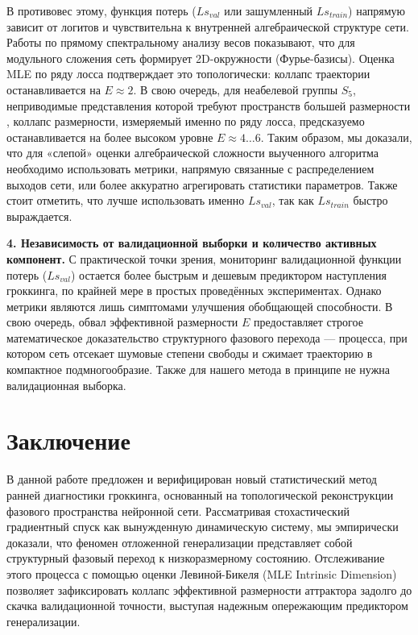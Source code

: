 \documentclass{article}
\begin{document}
В противовес этому, функция потерь ($Ls_{val}$ или зашумленный $Ls_{train}$) напрямую зависит от логитов и чувствительна к внутренней алгебраической структуре сети. Работы по прямому спектральному анализу весов \cite{nanda2023progress} показывают, что для модульного сложения сеть формирует 2D-окружности (Фурье-базисы). Оценка MLE по ряду лосса подтверждает это топологически: коллапс траектории останавливается на $E \approx 2$. В свою очередь, для неабелевой группы $S_5$, неприводимые представления которой требуют пространств большей размерности \cite{chughtai2023toy}, коллапс размерности, измеряемый именно по ряду лосса, предсказуемо останавливается на более высоком уровне $E \approx 4\dots 6$. Таким образом, мы доказали, что для «слепой» оценки алгебраической сложности выученного алгоритма необходимо использовать метрики, напрямую связанные с распределением выходов сети, или более аккуратно агрегировать статистики параметров. Также стоит отметить, что лучше использовать именно $Ls_{val}$, так как $Ls_{train}$ быстро выраждается.

\textbf{4. Независимость от валидационной выборки и количество активных компонент.}
С практической точки зрения, мониторинг валидационной функции потерь ($Ls_{val}$) остается более быстрым и дешевым предиктором наступления гроккинга, по крайней мере в простых проведённых экспериментах. Однако метрики являются лишь симптомами улучшения обобщающей способности. В свою очередь, обвал эффективной размерности $E$ предоставляет строгое математическое доказательство структурного фазового перехода — процесса, при котором сеть отсекает шумовые степени свободы и сжимает траекторию в компактное подмногообразие. Также для нашего метода в принципе не нужна валидационная выборка.






\section{Заключение}\label{sec:concl}

В данной работе предложен и верифицирован новый статистический метод ранней диагностики гроккинга, основанный на топологической реконструкции фазового пространства нейронной сети. Рассматривая стохастический градиентный спуск как вынужденную динамическую систему, мы эмпирически доказали, что феномен отложенной генерализации представляет собой структурный фазовый переход к низкоразмерному состоянию. Отслеживание этого процесса с помощью оценки Левиной-Бикеля (MLE Intrinsic Dimension) позволяет зафиксировать коллапс эффективной размерности аттрактора задолго до скачка валидационной точности, выступая надежным опережающим предиктором генерализации.
\end{document}
